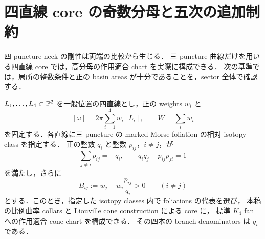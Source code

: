 
\section{四直線 core の奇数分母と五次の追加制約}
\label{q9:quintic-local-high-q}

四 puncture neck の剛性は両端の比較から生じる．
三 puncture 曲線だけを用いる四直線 core では，高分母の作用適合 chart を実際に構成できる．
次の基準では，局所の整数条件と正の basin areas が十分であることを，sector 全体で確認する．

\begin{proposition}\label{q9:four-line-criterion}
$L_1,\ldots,L_4\subset\mathbb P^2$ を一般位置の四直線とし，正の weights $w_i$ と
\[
 [\omega]=2\pi\sum_{i=1}^4 w_i[L_i],\qquad W=\sum_iw_i
\]
を固定する．各直線に三 puncture の marked Morse foliation の相対 isotopy class を指定する．
正の整数 $q_i$ と整数 $p_{ij}$，$i\ne j$，が
\begin{equation}\label{q9:four-line-arithmetic}
 \sum_{j\ne i}p_{ij}=-q_i,
 \qquad q_iq_j-p_{ij}p_{ji}=1
\end{equation}
を満たし，さらに
\begin{equation}\label{q9:four-line-basin-positive}
 B_{ij}:=w_j-w_i\frac{p_{ij}}{q_i}>0
 \qquad(i\ne j)
\end{equation}
とする．このとき，指定した isotopy classes 内で foliations の代表を選び，
本稿の比例曲率 collars と Liouville cone construction による core に，
標準 $K_4$ fan への作用適合 cone chart を構成できる．
その四本の branch denominators は $q_i$ である．
\end{proposition}

